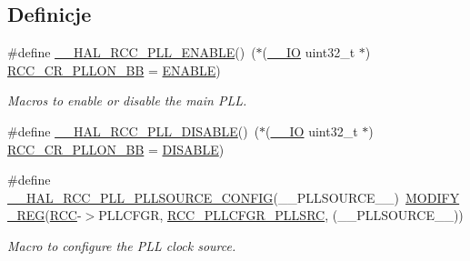 \subsection*{Definicje}
\begin{DoxyCompactItemize}
\item 
\#define \hyperlink{group___r_c_c___p_l_l___configuration_gaaf196a2df41b0bcbc32745c2b218e696}{\+\_\+\+\_\+\+H\+A\+L\+\_\+\+R\+C\+C\+\_\+\+P\+L\+L\+\_\+\+E\+N\+A\+B\+LE}()~($\ast$(\hyperlink{core__sc300_8h_aec43007d9998a0a0e01faede4133d6be}{\+\_\+\+\_\+\+IO} uint32\+\_\+t $\ast$) \hyperlink{group___r_c_c___bit_address___alias_region_ga0b0a8f171b66cc0d767716ba23ad3c6f}{R\+C\+C\+\_\+\+C\+R\+\_\+\+P\+L\+L\+O\+N\+\_\+\+BB} = \hyperlink{group___exported__types_ggac9a7e9a35d2513ec15c3b537aaa4fba1a7d46875fa3ebd2c34d2756950eda83bf}{E\+N\+A\+B\+LE})
\begin{DoxyCompactList}\small\item\em Macros to enable or disable the main P\+LL. \end{DoxyCompactList}\item 
\#define \hyperlink{group___r_c_c___p_l_l___configuration_ga718a6afcb1492cc2796be78445a7d5ab}{\+\_\+\+\_\+\+H\+A\+L\+\_\+\+R\+C\+C\+\_\+\+P\+L\+L\+\_\+\+D\+I\+S\+A\+B\+LE}()~($\ast$(\hyperlink{core__sc300_8h_aec43007d9998a0a0e01faede4133d6be}{\+\_\+\+\_\+\+IO} uint32\+\_\+t $\ast$) \hyperlink{group___r_c_c___bit_address___alias_region_ga0b0a8f171b66cc0d767716ba23ad3c6f}{R\+C\+C\+\_\+\+C\+R\+\_\+\+P\+L\+L\+O\+N\+\_\+\+BB} = \hyperlink{group___exported__types_ggac9a7e9a35d2513ec15c3b537aaa4fba1ad3a9df141be0ccf10389b640f492b26d}{D\+I\+S\+A\+B\+LE})
\item 
\#define \hyperlink{group___r_c_c___p_l_l___configuration_gaf9a8466f991888332ec978dc92c62d7d}{\+\_\+\+\_\+\+H\+A\+L\+\_\+\+R\+C\+C\+\_\+\+P\+L\+L\+\_\+\+P\+L\+L\+S\+O\+U\+R\+C\+E\+\_\+\+C\+O\+N\+F\+IG}(\+\_\+\+\_\+\+P\+L\+L\+S\+O\+U\+R\+C\+E\+\_\+\+\_\+)~\hyperlink{group___exported__macro_ga6553c99f510c3bab8cc0a91602053247}{M\+O\+D\+I\+F\+Y\+\_\+\+R\+EG}(\hyperlink{group___peripheral__declaration_ga74944438a086975793d26ae48d5882d4}{R\+CC}-\/$>$P\+L\+L\+C\+F\+GR, \hyperlink{group___peripheral___registers___bits___definition_ga92cb53ea81d2c47537eb217cc6659a2e}{R\+C\+C\+\_\+\+P\+L\+L\+C\+F\+G\+R\+\_\+\+P\+L\+L\+S\+RC}, (\+\_\+\+\_\+\+P\+L\+L\+S\+O\+U\+R\+C\+E\+\_\+\+\_\+))
\begin{DoxyCompactList}\small\item\em Macro to configure the P\+LL clock source. \end{DoxyCompactList}\item 

\end{DoxyCompactItemize}
